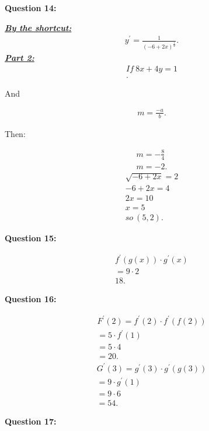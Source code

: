 \documentclass{report}
\begin{document}
    \bigbreak \noindent \bigbreak \noindent 
    \begin{Large}
        \textbf{Question 14:}
    \end{Large}
    \bigbreak \noindent 
    \bigbreak \noindent 
    \textbf{\textit{\underline{By the shortcut:}}}
    \begin{align*}
      y^{\prime} = \frac{1}{(-6+2x)^{\frac{1}{2}}}
    .\end{align*}
    \textbf{\textit{\underline{Part 2:}}}
    \begin{align*}
      If\ 8x+4y = 1 \\
    .\end{align*}
    \begin{center}
      And
    \end{center}
    \begin{align*}
      m = \frac{-a}{b} 
    .\end{align*}
    \begin{center}
      Then:
    \end{center}
    \begin{align*}
      m = -\frac{8}{4} \\ 
      m = -2
    .\end{align*}
    \begin{align*}
      \sqrt{-6+2x} = 2 \\ 
      -6+2x=4 \\ 
      2x=10 \\
      x =5 \\
      so\
      (5,2)
    .\end{align*}


    \bigbreak \noindent \bigbreak \noindent 
    \begin{Large}
        \textbf{Question 15:}
    \end{Large}
    \bigbreak \noindent 
    \bigbreak \noindent 
    \begin{align*}
      f^{\prime}(g(x)) \cdot g^{\prime}(x) \\
      = 9 \cdot 2 \\
      18
    .\end{align*}

    \bigbreak \noindent \bigbreak \noindent 
    \begin{Large}
        \textbf{Question 16:}
    \end{Large}
    \bigbreak \noindent 
    \bigbreak \noindent 
    \begin{align*}
      F^{\prime}(2) = f^{\prime}(2) \cdot f^{\prime}(f(2)) \\
      = 5 \cdot f^{\prime}(1) \\ 
      = 5 \cdot 4 \\
      = 20
    .\end{align*}
    \begin{align*}
      G^{\prime}(3) = g^{\prime}(3) \cdot g^{\prime}(g(3)) \\
      = 9 \cdot g^{\prime}(1) \\ 
      = 9 \cdot 6 \\
      = 54
    .\end{align*}

    \bigbreak \noindent \bigbreak \noindent 
    \begin{Large}
        \textbf{Question 17:}
    \end{Large}
    \bigbreak \noindent 
    \bigbreak \noindent 
    
\end{document}
